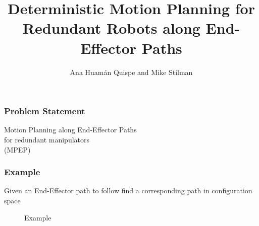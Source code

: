 \documentclass[10pt]{beamer}
\author{Ana Huam\'{a}n Quispe and Mike Stilman}
\title{ Deterministic Motion Planning for Redundant Robots along End-Effector Paths }
\begin{document}
\maketitle

\begin{frame}
\frametitle{Problem Statement}

\begin{center}
\begin{Large}
{\color{blue} Motion Planning along End-Effector Paths \\ for redundant manipulators \\ (MPEP) }
\end{Large}
\end{center}

\end{frame}


\begin{frame}
\frametitle{Example}

\begin{center}
\begin{normalsize}
{\color{blue} Given an End-Effector path to follow find a corresponding path in configuration space}
\end{normalsize}
\end{center}

\begin{figure}[]
		\centering
          \caption{Example}
          \label{fig:IntroExample}
\end{figure}


\end{frame}
\end{document}
